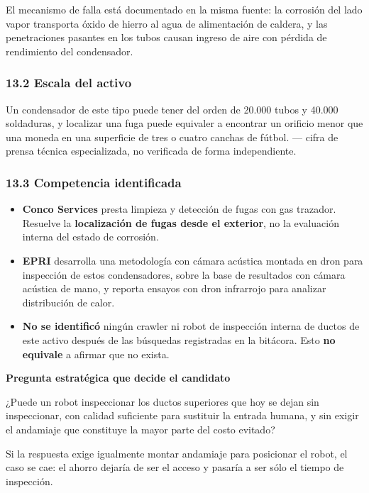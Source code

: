 \documentclass[11pt,a4paper]{article}
\newcommand{\badge}[3]{%
  \tcbox[on line, boxsep=1pt, left=2pt, right=2pt, top=0.5pt, bottom=0.5pt,
         colback=#1, colframe=#1, arc=1pt, boxrule=0pt]%
    {\color{#2}\sffamily\scriptsize\bfseries #3}}
\newenvironment{notaclave}[1]
  {\begin{notaclavebase}{\sffamily\scriptsize\bfseries\color{amber}#1}\par\vspace{2pt}}
  {\end{notaclavebase}}
\begin{document}
El mecanismo de falla está documentado en la misma fuente: la corrosión del lado vapor transporta óxido de hierro al agua de alimentación de caldera, y las penetraciones pasantes en los tubos causan ingreso de aire con pérdida de rendimiento del condensador.


\subsubsection*{13.2 Escala del activo}

Un condensador de este tipo puede tener del orden de 20.000 tubos y 40.000 soldaduras, y localizar una fuga puede equivaler a encontrar un orificio menor que una moneda en una superficie de tres o cuatro canchas de fútbol. \badge{lblue}{ink}{C} — cifra de prensa técnica especializada, no verificada de forma independiente.


\subsubsection*{13.3 Competencia identificada}

\begin{itemize}
\item \textbf{Conco Services} presta limpieza y detección de fugas con gas trazador. Resuelve la \textbf{localización de fugas desde el exterior}, no la evaluación interna del estado de corrosión. \badge{lblue}{ink}{C}
\item \textbf{EPRI} desarrolla una metodología con cámara acústica montada en dron para inspección de estos condensadores, sobre la base de resultados con cámara acústica de mano, y reporta ensayos con dron infrarrojo para analizar distribución de calor. \badge{sblue}{white}{B}
\item \textbf{No se identificó} ningún crawler ni robot de inspección interna de ductos de este activo después de las búsquedas registradas en la bitácora. Esto \textbf{no equivale} a afirmar que no exista.
\end{itemize}

\begin{notaclave}{Pregunta estratégica que decide el candidato}
¿Puede un robot inspeccionar los ductos superiores que hoy se dejan sin inspeccionar, con calidad suficiente para sustituir la entrada humana, y sin exigir el andamiaje que constituye la mayor parte del costo evitado?

Si la respuesta exige igualmente montar andamiaje para posicionar el robot, el caso se cae: el ahorro dejaría de ser el acceso y pasaría a ser sólo el tiempo de inspección.

\end{notaclave}
\end{document}

